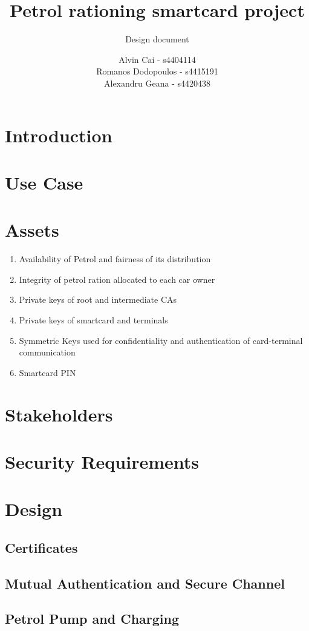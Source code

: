 \documentclass[a4paper,10pt]{llncs}
\title{Petrol rationing smartcard project}
\subtitle{Design document}
\author{Alvin Cai - s4404114 \\ Romanos Dodopoulos - s4415191 \\ Alexandru Geana - s4420438}
\institute{}
\begin{document}
\maketitle

\section{Introduction}


\section{Use Case}


\section{Assets}

\begin{enumerate}
  \item Availability of Petrol and fairness of its distribution
  \item Integrity of petrol ration allocated to each car owner
  \item Private keys of root and intermediate CAs
  \item Private keys of smartcard and terminals
  \item Symmetric Keys used for confidentiality and authentication of card-terminal communication
  \item Smartcard PIN 
\end{enumerate}

\section{Stakeholders}




\section{Security Requirements}



\section{Design}
\subsection{Certificates}

\subsection{Mutual Authentication and Secure Channel}

\subsection{Petrol Pump and Charging}
\end{document}
